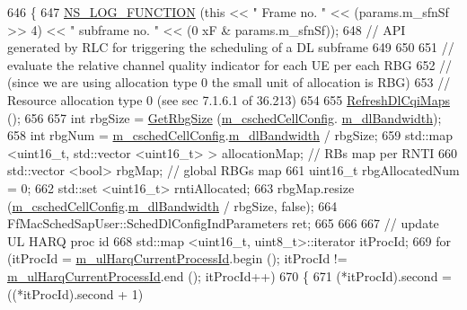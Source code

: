 \begin{DoxyCode}
646 \{
647   \hyperlink{log-macros-disabled_8h_a90b90d5bad1f39cb1b64923ea94c0761}{NS\_LOG\_FUNCTION} (\textcolor{keyword}{this} << \textcolor{stringliteral}{" Frame no. "} << (params.m\_sfnSf >> 4) << \textcolor{stringliteral}{" subframe no. "} << (0
      xF & params.m\_sfnSf));
648   \textcolor{comment}{// API generated by RLC for triggering the scheduling of a DL subframe}
649 
650 
651   \textcolor{comment}{// evaluate the relative channel quality indicator for each UE per each RBG}
652   \textcolor{comment}{// (since we are using allocation type 0 the small unit of allocation is RBG)}
653   \textcolor{comment}{// Resource allocation type 0 (see sec 7.1.6.1 of 36.213)}
654 
655   \hyperlink{classns3_1_1FdBetFfMacScheduler_a291aa78830b1cd2af29d184771ff9ea5}{RefreshDlCqiMaps} ();
656 
657   \textcolor{keywordtype}{int} rbgSize = \hyperlink{classns3_1_1FdBetFfMacScheduler_af21155ac09345dd6e838d428de12b922}{GetRbgSize} (\hyperlink{classns3_1_1FdBetFfMacScheduler_a52a10018d36c6a2e69820346a327dfc9}{m\_cschedCellConfig}.
      \hyperlink{structns3_1_1FfMacCschedSapProvider_1_1CschedCellConfigReqParameters_ad18c695bd3c9d7f742ba1dab4a941e8a}{m\_dlBandwidth});
658   \textcolor{keywordtype}{int} rbgNum = \hyperlink{classns3_1_1FdBetFfMacScheduler_a52a10018d36c6a2e69820346a327dfc9}{m\_cschedCellConfig}.\hyperlink{structns3_1_1FfMacCschedSapProvider_1_1CschedCellConfigReqParameters_ad18c695bd3c9d7f742ba1dab4a941e8a}{m\_dlBandwidth} / rbgSize;
659   std::map <uint16\_t, std::vector <uint16\_t> > allocationMap; \textcolor{comment}{// RBs map per RNTI}
660   std::vector <bool> rbgMap;  \textcolor{comment}{// global RBGs map}
661   uint16\_t rbgAllocatedNum = 0;
662   std::set <uint16\_t> rntiAllocated;
663   rbgMap.resize (\hyperlink{classns3_1_1FdBetFfMacScheduler_a52a10018d36c6a2e69820346a327dfc9}{m\_cschedCellConfig}.\hyperlink{structns3_1_1FfMacCschedSapProvider_1_1CschedCellConfigReqParameters_ad18c695bd3c9d7f742ba1dab4a941e8a}{m\_dlBandwidth} / rbgSize, \textcolor{keyword}{false});
664   FfMacSchedSapUser::SchedDlConfigIndParameters ret;
665 
666 
667   \textcolor{comment}{//   update UL HARQ proc id}
668   std::map <uint16\_t, uint8\_t>::iterator itProcId;
669   \textcolor{keywordflow}{for} (itProcId = \hyperlink{classns3_1_1FdBetFfMacScheduler_a12a5dedfa74cd590624828dcffafa855}{m\_ulHarqCurrentProcessId}.begin (); itProcId != 
      \hyperlink{classns3_1_1FdBetFfMacScheduler_a12a5dedfa74cd590624828dcffafa855}{m\_ulHarqCurrentProcessId}.end (); itProcId++)
670     \{
671       (*itProcId).second = ((*itProcId).second + 1) %

\end{DoxyCode}
